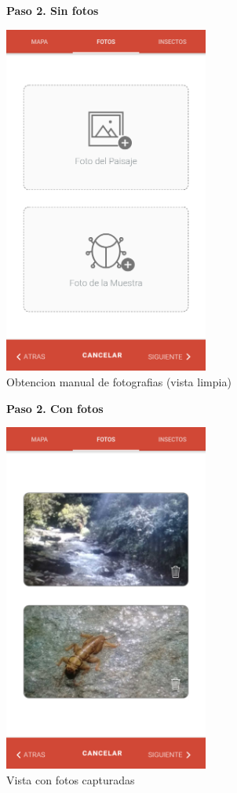 				\begin{figure}
					\centering
					\textbf{Paso 2. Sin fotos}\par\medskip
					\includegraphics[width=0.6\textwidth]{Screenshots/registroPaso2A.png}
					\caption{Obtencion manual de fotografias (vista limpia)}
				\end{figure}
				
				\begin{figure}
					\centering
					\textbf{Paso 2. Con fotos}\par\medskip
					\includegraphics[width=0.6\textwidth]{Screenshots/registroPaso2B.png}
					\caption{Vista con fotos capturadas}
				\end{figure}
				

